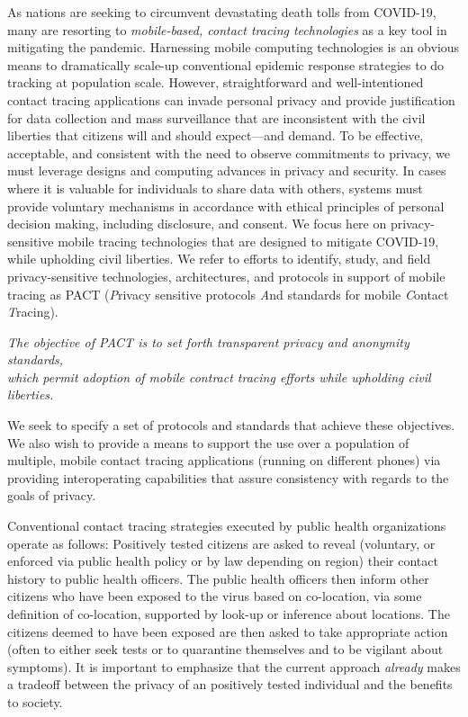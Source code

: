 \documentclass{article}
\begin{document}
As nations are seeking to circumvent devastating death tolls from COVID-19, many are resorting to \emph{mobile-based, contact tracing technologies} as a key tool in mitigating the pandemic. Harnessing mobile computing technologies is an obvious means to dramatically scale-up conventional epidemic response strategies to do tracking at population scale. However, straightforward and well-intentioned contact tracing applications can invade personal privacy and provide justification for data collection and mass surveillance that are inconsistent with the civil liberties that citizens will and should expect---and demand. To be effective, acceptable, and consistent with the need to observe commitments to  privacy, we must leverage designs and computing advances in privacy and security. In cases where it is valuable for individuals to share data with others, systems must provide voluntary mechanisms in accordance with ethical principles of personal decision making, including disclosure, and consent. We focus here on privacy-sensitive mobile tracing technologies that are designed to mitigate COVID-19, while upholding civil liberties. We refer to efforts to identify, study, and field  privacy-sensitive technologies, architectures, and protocols in support of mobile tracing as PACT (\emph{P}rivacy sensitive protocols \emph{A}nd standards for mobile \emph{C}ontact \emph{T}racing).

\begin{center}
\emph{The objective of PACT is to set forth transparent privacy and
  anonymity standards,\\
  which permit adoption of mobile contract tracing efforts while upholding civil liberties.}
\end{center}

We seek to specify a set of protocols and standards that achieve
these objectives. We also wish to provide a means to support the use over a population of multiple, mobile contact tracing applications (running on different phones) via providing interoperating capabilities that assure consistency with regards to the goals of privacy. 

Conventional contact tracing strategies executed by public health organizations operate as follows: Positively tested citizens are asked to reveal (voluntary, or enforced via public health policy or by law depending on region) their contact history to public health officers. The public health officers then inform other citizens who have been exposed to the virus based on co-location, via some definition of co-location, supported by look-up or inference about locations. The citizens deemed to have been exposed are then asked to take appropriate action (often to either seek tests or to quarantine
themselves and to be vigilant about symptoms).  It is important to emphasize that the current approach \emph{already} makes a tradeoff between the privacy of an positively tested individual and the benefits to society.
\end{document}
